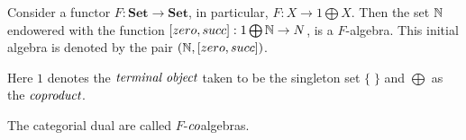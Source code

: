 \begin{exmp}
 Consider a functor $F: \textbf{Set} \to \textbf{Set}$, in particular, $F: X \to 1 \bigoplus X$.
 Then the set $\mathbb{N}$ endowered with the function $[zero,succ]: 1 \bigoplus \mathbb{N} \to N$, is a $F$-algebra.
 This initial algebra is denoted by the pair $(\mathbb{N}, [zero,succ])$.
\end{exmp}

Here $1$ denotes the $\emph{terminal object}$ taken to be the singleton set $\{ \; \}$
and $\bigoplus$ as the $\emph{coproduct}$.

\begin{rem}
 The categorial dual are called $F$-$\emph{co}$algebras.
\end{rem}